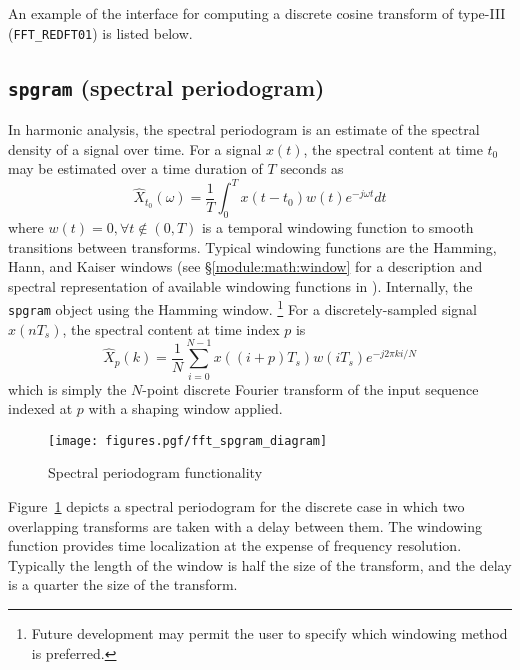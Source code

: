An example of the interface for computing a discrete cosine transform
of type-III ({\tt FFT\_REDFT01}) is listed below.
%


%

%
%
\subsection{{\tt spgram} (spectral periodogram)}
\label{module:fft:spgram}

In harmonic analysis, the spectral periodogram is an estimate of the
spectral density of a signal over time.
For a signal $x(t)$, the spectral content at time $t_0$ may be estimated
over a time duration of $T$ seconds as
\[
    \hat{X}_{t_0}(\omega) =
        \frac{1}{T} \int_{0}^{T} { x(t-t_0)w(t)e^{-j\omega t} dt }
\]
where $w(t) = 0,\forall t \notin (0,T)$
is a temporal windowing function to smooth transitions
between transforms.
Typical windowing functions are the Hamming, Hann, and Kaiser windows
(see \S\ref{module:math:window} for a description and spectral
representation of available windowing functions in \liquid).
Internally, the {\tt spgram} object using the Hamming window.%
\footnote{Future development may permit the user to specify which
          windowing method is preferred.}
%
For a discretely-sampled signal $x(nT_s)$, the spectral content at time
index $p$ is
\[
    \hat{X}_p(k) = 
        \frac{1}{N}
        \sum_{i=0}^{N-1}{
            x((i+p)T_s) w(iT_s) e^{-j 2 \pi k i/N}
        }
\]
%
which is simply the $N$-point discrete Fourier transform of the input
sequence indexed at $p$ with a shaping window applied.
%
\begin{figure}
\centering
  \texttt{[image: figures.pgf/fft\_spgram\_diagram]}
\caption{Spectral periodogram functionality}
\label{fig:module:fft:spgram:diagram}
\end{figure}
%
Figure~\ref{fig:module:fft:spgram:diagram} depicts a spectral
periodogram for the discrete case
in which two overlapping transforms are taken with a delay between them.
The windowing function provides time localization at the expense of
frequency resolution.
Typically the length of the window is half the size of the transform,
and the delay is a quarter the size of the transform.

